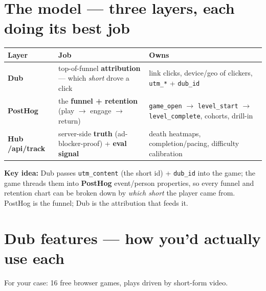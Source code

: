 \documentclass[11pt]{article}
\title{\color{accent}\doctitle}
\author{Engine · TeX backend}
\date{\today}
\newcommand{\callout}[1]{\par\medskip\noindent
  \colorbox{soft}{\parbox{\dimexpr\linewidth-2\fboxsep\relax}{\color{ink}#1}}\par\medskip}
\begin{document}
\maketitle\thispagestyle{fancy}

\section{The model --- three layers, each doing its best job}
\begin{center}\small
\begin{tabular}{@{}P{2.3cm}P{4.2cm}P{6.6cm}@{}}
\toprule
Layer & Job & Owns \\
\midrule
\textbf{Dub} & top-of-funnel \textbf{attribution} --- which \emph{short} drove a click & link clicks, device/geo of clickers, \texttt{utm\_*} + \texttt{dub\_id} \\
\textbf{PostHog} & the \textbf{funnel + retention} (play $\to$ engage $\to$ return) & \texttt{game\_open} $\to$ \texttt{level\_start} $\to$ \texttt{level\_complete}, cohorts, drill-in \\
\textbf{Hub /api/track} & server-side \textbf{truth} (ad-blocker-proof) + \textbf{eval signal} & death heatmaps, completion/pacing, difficulty calibration \\
\bottomrule
\end{tabular}
\end{center}

\callout{\textbf{Key idea:} Dub passes \texttt{utm\_content} (the short id) + \texttt{dub\_id}
into the game; the game threads them into \textbf{PostHog} event/person properties, so every
funnel and retention chart can be broken down by \emph{which short} the player came from.
PostHog is the funnel; Dub is the attribution that feeds it.}

\section{Dub features --- how you'd actually use each}
For your case: 16 free browser games, plays driven by short-form video.
\end{document}
